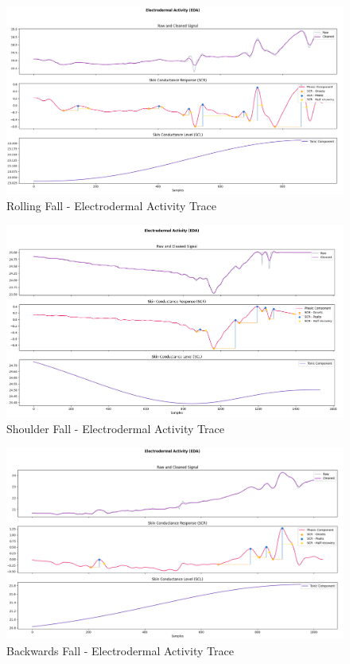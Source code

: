 \begin{figure}[h]
    \centering
    \includegraphics[width=\textwidth]{./images/bitalino/Rolling.png}
    \caption{Rolling Fall - Electrodermal Activity Trace}
    \label{fig:bitalino-rolling}
\end{figure}

\begin{figure}[h]
    \centering
    \includegraphics[width=\textwidth]{./images/bitalino/Shoulder.png}
    \caption{Shoulder Fall - Electrodermal Activity Trace}
    \label{fig:bitalino-shoulder}
\end{figure}

\begin{figure}[h]
    \centering
    \includegraphics[width=\textwidth]{./images/bitalino/Backwards.png}
    \caption{Backwards Fall - Electrodermal Activity Trace}
    \label{fig:bitalino-backwards}
\end{figure}

